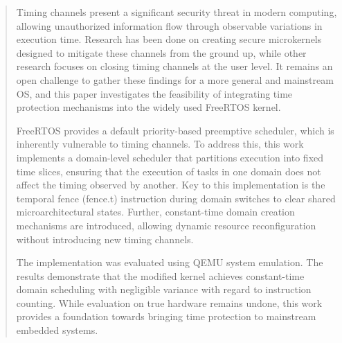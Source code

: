 \begin{abstract}
Timing channels present a significant security threat in modern computing,
allowing unauthorized information flow through observable variations in
execution time. Research has been done on creating secure microkernels designed
to mitigate these channels from the ground up, while other research focuses on
closing timing channels at the user level. It remains an open challenge to
gather these findings for a more general and mainstream OS, and this paper
investigates the feasibility of integrating time protection mechanisms
into the widely used FreeRTOS kernel.

FreeRTOS provides a default priority-based preemptive scheduler, which is
inherently vulnerable to timing channels. To address this, this work
implements a domain-level scheduler that partitions execution into
fixed time slices, ensuring that the execution of tasks in one domain does not
affect the timing observed by another. Key to this implementation is the
temporal fence (fence.t) instruction during domain switches to clear shared
microarchitectural states. Further, constant-time domain creation mechanisms
are introduced, allowing dynamic resource reconfiguration without introducing
new timing channels.

The implementation was evaluated using QEMU system emulation. The results
demonstrate that the modified kernel achieves constant-time domain scheduling
with negligible variance with regard to instruction counting. While evaluation
on true hardware remains undone, this work provides a foundation towards
bringing time protection to mainstream embedded systems.
\end{abstract}
